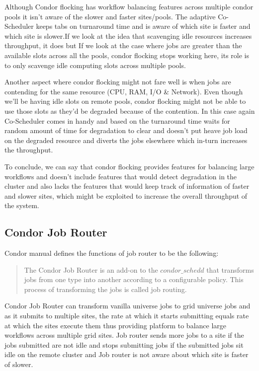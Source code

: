 \documentclass[ms,electronic,double]{nuthesis}
\begin{document}
Although Condor flocking has workflow balancing features across multiple condor 
pools it isn't aware of the slower and faster sites/pools. The adaptive Co-Scheduler 
keeps tabs on turnaround time and is aware of which site is faster and which site is slower.If we 
look at the idea that scavenging idle resources increases throughput, it does 
but If we look at the case where jobs are greater than the available slots 
across all the pools, condor flocking stops working here, its role is to only 
scavenge idle computing slots across multiple pools. 

Another aspect where condor flocking might not fare well is when jobs are 
contending for the same resource (CPU, RAM, I/O \& Network). Even though we'll be 
having idle slots on remote pools, condor flocking might not be able to use those 
slots as they'd be degraded because of the contention. In this case again 
Co-Scheduler comes in handy and based on the turnaround time waits for random 
amount of time for degradation to clear and doesn't put heave job load on the 
degraded resource and diverts the jobs elsewhere which in-turn increases the 
throughput.

To conclude, we can say that condor flocking provides features for balancing 
large workflows and doesn't include features that would detect degradation in 
the cluster and also lacks the features that would keep track of information of faster and 
slower sites, which might be exploited to increase the overall throughput of the system. 

\subsection{Condor Job Router}

Condor manual defines the functions of job router to be the following:
\begin{quotation}

The Condor Job Router is an add-on to the $condor\_schedd$ that transforms jobs from one type into 
another according to a configurable policy. 
This process of transforming the jobs is called job routing.
\end{quotation}

Condor Job Router can transform vanilla universe jobs to grid universe jobs and 
as it submits to multiple sites, the rate at which it starts submitting equals 
rate at which the sites execute them thus providing platform to balance large 
workflows across multiple grid sites. Job router sends more jobs to a site if 
the jobs submitted are not idle and stops submitting jobs if the submitted jobs 
sit idle on the remote cluster and Job router is not aware about which site is 
faster of slower.
\end{document}
